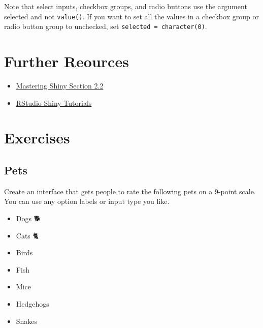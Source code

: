 \documentclass[
  oneside]{book}
\newcommand{\AttributeTok}[1]{\textcolor[rgb]{0.77,0.63,0.00}{#1}}
\providecommand{\tightlist}{%
  \setlength{\itemsep}{0pt}\setlength{\parskip}{0pt}}
\begin{document}
\begin{warning}
Note that select inputs, checkbox groups, and radio buttons use the argument \AttributeTok{selected} and not \texttt{value}\texttt{()}. If you want to set all the values in a checkbox group or radio button group to unchecked, set \texttt{selected\ =\ character(0)}.

\end{warning}

\hypertarget{resources-inputs}{%
\section{Further Reources}\label{resources-inputs}}

\begin{itemize}
\tightlist
\item
  \href{https://mastering-shiny.org/basic-ui.html\#inputs}{Mastering Shiny Section 2.2}
\item
  \href{https://vimeo.com/rstudioinc/review/131218530/212d8a5a7a/\#t=10m41s}{RStudio Shiny Tutorials}
\end{itemize}

\hypertarget{exercises-inputs}{%
\section{Exercises}\label{exercises-inputs}}

\hypertarget{pets}{%
\subsection{Pets}\label{pets}}

Create an interface that gets people to rate the following pets on a 9-point scale. You can use any option labels or input type you like.

\begin{itemize}
\tightlist
\item
  Dogs 🐕\\
\item
  Cats 🐈\\
\item
  Birds 🦜\\
\item
  Fish 🐠\\
\item
  Mice 🐁\\
\item
  Hedgehogs 🦔\\
\item
  Snakes 🐍
\end{itemize}
\end{document}
